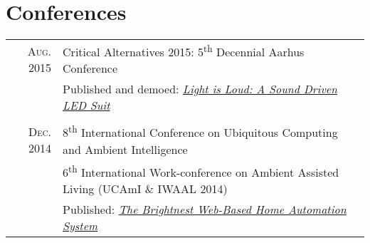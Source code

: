 \documentclass[letterpaper,10pt]{article}
\begin{document}
\section{Conferences}
\begin{tabular}{R|p{6.2in}}
	\textsc{Aug.} 2015 & Critical Alternatives 2015: 5\textsuperscript{th} Decennial Aarhus Conference                                                 \\
	                   & \small Published and demoed: \href{https://doi.org/10.7146/aahcc.v1i1.21320}{\emph{Light is Loud: A Sound Driven LED Suit}}   \\
	                                                                                                                               \\

	\textsc{Dec.} 2014 & 8\textsuperscript{th} International Conference on Ubiquitous Computing and Ambient Intelligence                               \\
	                   & 6\textsuperscript{th} International Work-conference on Ambient Assisted Living (UCAmI \& IWAAL 2014)                          \\
	                   & \small Published: \href{https://doi.org/10.1007/978-3-319-13102-3_14}{\emph{The Brightnest Web-Based Home Automation System}} \\
\end{tabular}


\end{document}
